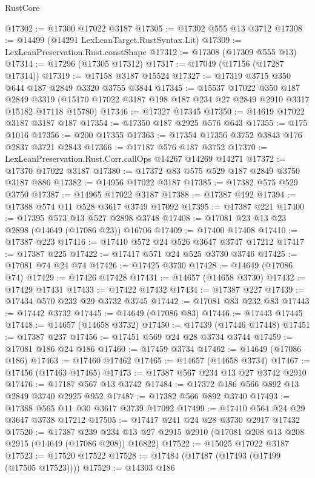 \begin{lexlean}{RustCore}
\begin{coremodule}
@17302 := @17300 @17022 @3187
@17305 := @17302 @555 @13 @3712
@17308 := @14499 (@14291 LexLeanTarget.RustSyntax.Lit)
@17309 := LexLeanPreservation.Rust.constShape
@17312 := @17308 (@17309 @555 @13)
@17314 := @17296 (@17305 @17312)
@17317 := @17049 (@17156 (@17287 @17314))
@17319 := @17158 @3187 @15524
@17327 := @17319 @3715 @350 @644 @187 @2849 @3320 @3755 @3844
@17345 := @15537
    @17022
    @350
    @187
    @2849
    @3319
    (@15170 @17022 @3187 @198 @187 @234 @27 @2849 @2910 @3317 @15182 @17118 @15780)
@17346 := @17327 @17345
@17350 := @14619 @17022 @3187 @3187 @187
@17354 := @17350 @187 @2925 @576 @643
@17355 := @175 @1016
@17356 := @200 @17355
@17363 := @17354 @17356 @3752 @3843 @176 @2837 @3721 @2843
@17366 := @17187 @576 @187 @3752
@17370 := LexLeanPreservation.Rust.Corr.callOps @14267 @14269 @14271
@17372 := @17370 @17022 @3187
@17380 := @17372 @83 @575 @529 @187 @2849 @3750 @3187 @886
@17382 := @14956 @17022 @3187
@17385 := @17382 @575 @529 @3750
@17387 := @14965 @17022 @3187
@17388 := @17387 @192
@17394 := @17388 @574 @11 @528 @3617 @3749 @17092
@17395 := @17387 @221
@17400 := @17395 @573 @13 @527 @2898 @3748
@17408 := @17081 @23 @13 @23 @2898 (@14649 (@17086 @23)) @16706
@17409 := @17400 @17408
@17410 := @17387 @223
@17416 := @17410 @572 @24 @526 @3647 @3747 @17212
@17417 := @17387 @225
@17422 := @17417 @571 @24 @525 @3730 @3746
@17425 := @17081 @74 @24 @74
@17426 := @17425 @3730
@17428 := @14649 (@17086 @74)
@17429 := @17426 @17428
@17431 := @14657 (@14658 @3730)
@17432 := @17429 @17431
@17433 := @17422 @17432
@17434 := @17387 @227
@17439 := @17434 @570 @232 @29 @3732 @3745
@17442 := @17081 @83 @232 @83
@17443 := @17442 @3732
@17445 := @14649 (@17086 @83)
@17446 := @17443 @17445
@17448 := @14657 (@14658 @3732)
@17450 := @17439 (@17446 @17448)
@17451 := @17387 @237
@17456 := @17451 @569 @24 @28 @3734 @3744
@17459 := @17081 @186 @24 @186
@17460 := @17459 @3734
@17462 := @14649 (@17086 @186)
@17463 := @17460 @17462
@17465 := @14657 (@14658 @3734)
@17467 := @17456 (@17463 @17465)
@17473 := @17387 @567 @234 @13 @27 @3742 @2910
@17476 := @17187 @567 @13 @3742
@17484 := @17372 @186 @566 @892 @13 @2849 @3740 @2925 @952
@17487 := @17382 @566 @892 @3740
@17493 := @17388 @565 @11 @30 @3617 @3739 @17092
@17499 := @17410 @564 @24 @29 @3647 @3738 @17212
@17505 := @17417 @241 @24 @28 @3730 @2917 @17432
@17520 := @17387
    @239
    @234
    @13
    @27
    @2915
    @2910
    (@17081 @208 @13 @208 @2915 (@14649 (@17086 @208)) @16822)
@17522 := @15025 @17022 @3187
@17523 := @17520 @17522
@17528 := @17484 (@17487 (@17493 (@17499 (@17505 @17523))))
@17529 := @14303 @186

\end{coremodule}
\end{lexlean}
